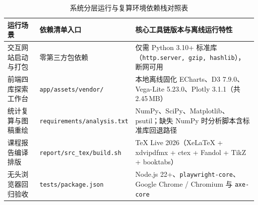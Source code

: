 {\setlength{\parfillskip}{0pt plus 1fil}
\begin{table}[!htbp]
\centering
\caption{系统分层运行与复算环境依赖栈对照表}\label{tab:app-g-env}
\ReportTableStyle
\begin{tabularx}{\linewidth}{@{}>{\raggedright\arraybackslash}p{2.9cm} >{\raggedright\arraybackslash}p{3.4cm} >{\raggedright\arraybackslash}X@{}}
\toprule
\textbf{运行场景} & \textbf{依赖清单入口} & \textbf{核心工具链版本与离线运行特性} \\
\midrule
交互网站启动与打包 & 零第三方包依赖 & 仅需 Python 3.10+ 标准库（\texttt{http.server, gzip, hashlib}），断网可用 \\
前端四库探索工作台 & \texttt{app/assets/vendor/} & 本地离线固化 ECharts、D3 7.9.0、Vega-Lite 5.23.0、Plotly 3.1.1（共 2.45\,MB） \\
统计复算与图稿重绘 & \texttt{requirements/analysis.txt} & NumPy、SciPy、Matplotlib、psutil；缺失 NumPy 时分析脚本含标准库回退路径 \\
课程报告编译排版 & \texttt{report/src\_tex/build.sh} & TeX Live 2026（XeLaTeX + xdvipdfmx + ctex + Fandol + TikZ + booktabs） \\
无头浏览器回归验收 & \texttt{tests/package.json} & Node.js 22+、\texttt{playwright-core}、Google Chrome / Chromium 与 \texttt{axe-core} \\
\bottomrule
\end{tabularx}
\end{table}

}
